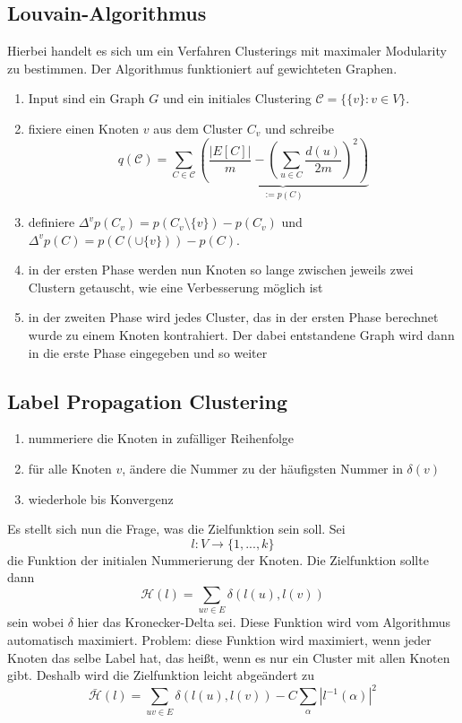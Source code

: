 \documentclass[a4paper, 12pt]{article}
\theoremstyle{plain}
\theoremstyle{definition}
\theoremstyle{lemma}
\theoremstyle{remark}
\theoremstyle{corollary}
\theoremstyle{example}
\begin{document}
	\subsection{Louvain-Algorithmus}
	Hierbei handelt es sich um ein Verfahren Clusterings mit maximaler Modularity zu bestimmen. Der Algorithmus funktioniert auf gewichteten Graphen. \begin{enumerate}
		\item Input sind ein Graph $G$ und ein initiales Clustering $\mathcal{C} = \{\{v\}: v \in V\}$.
		\item fixiere einen Knoten $v$ aus dem Cluster $C_v$ und schreibe \[q(\mathcal{C}) = \sum_{C \in \mathcal{C}}\underbrace{\left(\frac{\left|E[C]\right|}{m} - \left(\sum_{u \in C} \frac{d(u)}{2m}\right)^2\right)}_{:=p(C)}\]
		\item definiere $\Delta^v p(C_v) = p(C_v \setminus\{v\})-p(C_v)$ und $\Delta^v p(C) = p(C(\cup \{v\})) - p(C)$.
		\item in der ersten Phase werden nun Knoten so lange zwischen jeweils zwei Clustern getauscht, wie eine Verbesserung möglich ist
		\item in der zweiten Phase wird jedes Cluster, das in der ersten Phase berechnet wurde zu einem Knoten kontrahiert. Der dabei entstandene Graph wird dann in die erste Phase eingegeben und so weiter
	\end{enumerate}
	\subsection{Label Propagation Clustering}
	\begin{enumerate}
		\item nummeriere die Knoten in zufälliger Reihenfolge
		\item für alle Knoten $v$, ändere die Nummer zu der häufigsten Nummer in $\delta(v)$
		\item wiederhole bis Konvergenz
	\end{enumerate}
	Es stellt sich nun die Frage, was die Zielfunktion sein soll. Sei \[l:V \to \{1,...,k\}\] die Funktion der initialen Nummerierung der Knoten. Die Zielfunktion sollte dann \[\mathcal{H}(l) = \sum_{uv \in E} \delta(l(u),l(v))\] sein wobei $\delta$ hier das Kronecker-Delta sei. Diese Funktion wird vom Algorithmus automatisch maximiert. Problem: diese Funktion wird maximiert, wenn jeder Knoten das selbe Label hat, das heißt, wenn es nur ein Cluster mit allen Knoten gibt. Deshalb wird die Zielfunktion leicht abgeändert zu \[\bar{\mathcal{H}}(l) = \sum_{uv \in E} \delta(l(u),l(v)) - C\sum_\alpha \left|l^{-1}(\alpha)\right|^2\]
\end{document}
